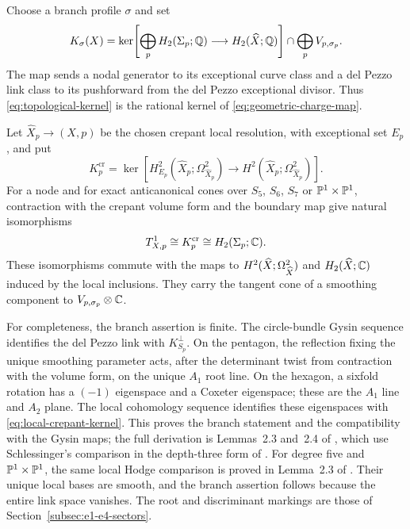 Choose a branch profile $\sigma$ and set
\begin{equation}
 K_{\sigma}(X)
 =\ker\!\left[
   \bigoplus_pH_2(\Sigma_p;\mathbb Q)\longrightarrow H_2(\widehat X;\mathbb Q)
 \right]
 \cap\bigoplus_pV_{p,\sigma_p}.
 \label{eq:topological-kernel}
\end{equation}
The map sends a nodal generator to its exceptional curve class and a del
Pezzo link class to its pushforward from the del Pezzo exceptional divisor. Thus
\eqref{eq:topological-kernel} is the rational kernel of
\eqref{eq:geometric-charge-map}.

\begin{lemma}
\label{lem:local-comparison}
Let $\widehat X_p\to(X,p)$ be the chosen crepant local resolution, with
exceptional set $E_p$, and put
\begin{equation}
 K_p^{\mathrm{cr}}=
 \ker\!\left[
 H^2_{E_p}(\widehat X_p;\Omega^2_{\widehat X_p})
 \longrightarrow H^2(\widehat X_p;\Omega^2_{\widehat X_p})
 \right].
 \label{eq:local-crepant-kernel}
\end{equation}
For a node and for exact anticanonical cones over $S_5$, $S_6$, $S_7$
or $\mathbb P^1\times\mathbb P^1$, contraction with the
crepant volume form and the boundary map give natural isomorphisms
\begin{equation}
 T^1_{X,p}\cong K_p^{\mathrm{cr}}
 \cong H_2(\Sigma_p;\mathbb C).
 \label{eq:local-hodge-identification}
\end{equation}
These isomorphisms commute with the maps to
$H^2(\widehat X;\Omega^2_{\widehat X})$ and $H_2(\widehat X;\mathbb C)$ induced by the local
inclusions. They carry the tangent cone of a smoothing component to
$V_{p,\sigma_p}\otimes\mathbb C$.
\end{lemma}

For completeness, the branch assertion is finite. The circle-bundle Gysin
sequence identifies the del Pezzo link with $K_{S_p}^{\perp}$. On the
pentagon, the reflection fixing the unique smoothing parameter acts, after
the determinant twist from contraction with the volume form, on the unique
$A_1$ root line. On the hexagon, a sixfold rotation has a $(-1)$ eigenspace
and a Coxeter eigenspace; these are the $A_1$ line and $A_2$ plane. The local
cohomology sequence identifies these eigenspaces with
\eqref{eq:local-crepant-kernel}. This proves the branch statement and the
compatibility with the Gysin maps; the full derivation is Lemmas~2.3
and~2.4 of \cite{Wuebben:2026smoothing}, which use Schlessinger's
comparison \cite{Schlessinger:1971} in the depth-three form of
\cite{Friedman:2022}.
For degree five and $\mathbb P^1\times\mathbb P^1$, the same local Hodge
comparison is proved in Lemma~2.3 of \cite{Wuebben:2026smoothing}.
Their unique local bases are smooth, and the branch assertion follows
because the entire link space vanishes. The root and discriminant markings
are those of Section~\ref{subsec:e1-e4-sectors}.


